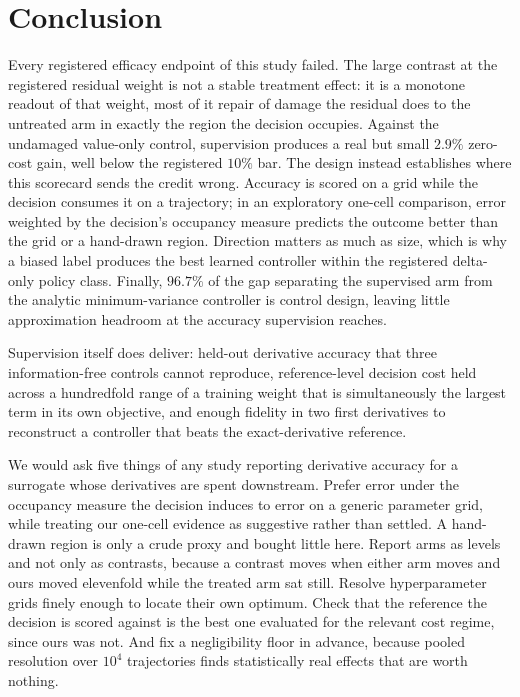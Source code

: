 \documentclass{article}
\begin{document}
\section{Conclusion}
\label{sec:conclusion}

Every registered efficacy endpoint of this study failed. The large contrast at the
registered residual weight is not a stable treatment effect: it is a monotone
readout of that weight, most of it repair of damage the residual does to the
untreated arm in exactly the region the decision occupies. Against the undamaged
value-only control, supervision produces a real but small $2.9\%$ zero-cost gain,
well below the registered $10\%$ bar. The design instead establishes where this
scorecard sends the credit wrong. Accuracy is scored on a grid while the decision
consumes it on a trajectory; in an exploratory one-cell comparison, error weighted
by the decision's occupancy measure predicts the outcome better than the grid or a
hand-drawn region. Direction matters as much as size, which is why a biased label
produces the best learned controller within the registered delta-only policy class.
Finally, $96.7\%$ of the gap separating the supervised arm from the analytic
minimum-variance controller is control design, leaving little approximation
headroom at the accuracy supervision reaches.

Supervision itself does deliver: held-out derivative accuracy that three
information-free controls cannot reproduce, reference-level decision cost held
across a hundredfold range of a training weight that is simultaneously the largest
term in its own objective, and enough fidelity in two first derivatives to
reconstruct a controller that beats the exact-derivative reference.

We would ask five things of any study reporting derivative accuracy for a surrogate
whose derivatives are spent downstream. Prefer error under the occupancy measure
the decision induces to error on a generic parameter grid, while treating our
one-cell evidence as suggestive rather than settled. A hand-drawn region is only a
crude proxy and bought little here.
Report arms as levels and not only as contrasts, because a contrast moves when
either arm moves and ours moved elevenfold while the treated arm sat still. Resolve
hyperparameter grids finely enough to locate their own optimum. Check that the
reference the decision is scored against is the best one evaluated for the relevant
cost regime, since ours was not. And fix a negligibility floor in advance, because pooled resolution over
$10^{4}$ trajectories finds statistically real effects that are worth nothing.
\end{document}
